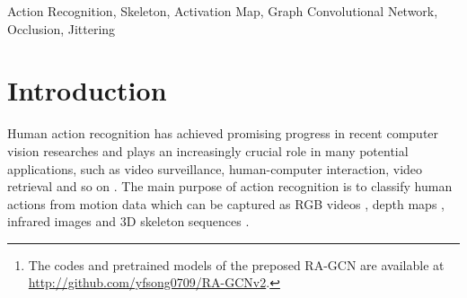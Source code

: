 \documentclass[journal]{IEEEtran}
\begin{document}
\begin{abstract}
    Current methods for skeleton-based human action recognition usually work with complete skeletons. However, in real scenarios, it is inevitable to capture incomplete or noisy skeletons, which could significantly deteriorate the performance of current methods when some informative joints are occluded or disturbed. To improve the robustness of action recognition models, a multi-stream graph convolutional network (GCN) is proposed to explore sufficient discriminative features spreading over all skeleton joints, so that the distributed redundant representation reduces the sensitivity of the action models to non-standard skeletons. Concretely, the backbone GCN is extended by a series of ordered streams which is responsible for learning discriminative features from the joints less activated by preceding streams. Here, the activation degrees of skeleton joints of each GCN stream are measured by the class activation maps (CAM), and only the information from the unactivated joints will be passed to the next stream, by which rich features over all active joints are obtained. Thus, the proposed method is termed richly activated GCN (RA-GCN). Compared to the state-of-the-art (SOTA) methods, the RA-GCN achieves comparable performance on the standard NTU RGB+D 60 and 120 datasets. More crucially, on the synthetic occlusion and jittering datasets, the performance deterioration due to the occluded and disturbed joints can be significantly alleviated by utilizing the proposed RA-GCN.\footnote{The codes and pretrained models of the preposed RA-GCN are available at \href{http://github.com/yfsong0709/RA-GCNv2}{http://github.com/yfsong0709/RA-GCNv2}.}
\end{abstract}

\begin{IEEEkeywords}
    Action Recognition, Skeleton, Activation Map, Graph Convolutional Network, Occlusion, Jittering
\end{IEEEkeywords}

\section{Introduction}
\label{sec:intro}

Human action recognition has achieved promising progress in recent computer vision researches and plays an increasingly crucial role in many potential applications, such as video surveillance, human-computer interaction, video retrieval and so on \cite{aggarwal2011human, sudha2017approaches, weinland2011survey}. The main purpose of action recognition is to classify human actions from motion data which can be captured as RGB videos \cite{sharma2015action, tran2015learning}, depth maps \cite{jalal2017robust}, infrared images \cite{akula2018deep} and 3D skeleton sequences \cite{liu2016spatio, zhang2017view, yan2018spatial}.
\end{document}
